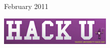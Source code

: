 \begin{frame}
  \begin{center}

    \vspace*{2.2cm}
    
    \textbf{\small \subjectName}
    
    {\large \docTitle}
    
    \medskip
    {\footnotesize February 2011}

    \vspace*{1.5cm}

  
    \includegraphics[width=0.4\textwidth]{figs/hacku.pdf}

  \end{center}
  \vspace{1cm}
\end{frame}
